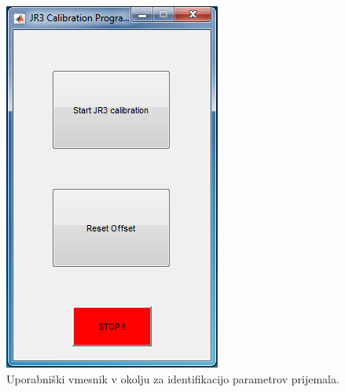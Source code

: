 \begin{figure}[!h]
	\centering
	\includegraphics[scale=0.5]{./Slike/jr3_calibration.png}
	\caption{Uporabni\v{s}ki vmesnik v okolju \matlab za identifikacijo parametrov prijemala.}
	\label{fig:jr3_calibration}
\end{figure}
